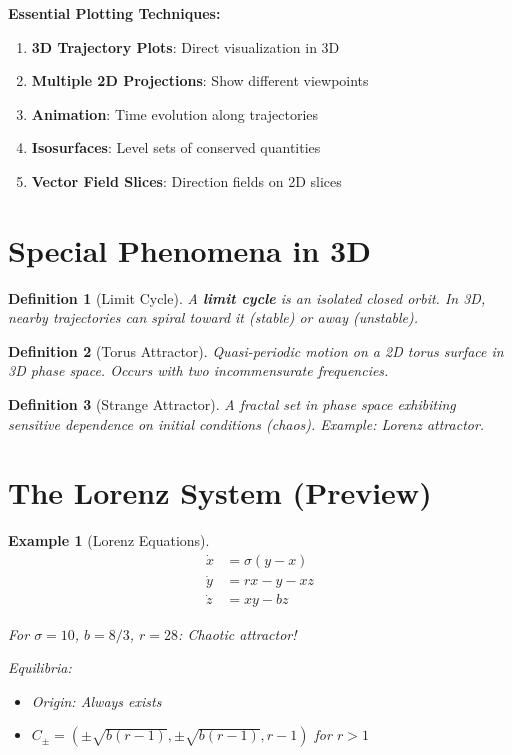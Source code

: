 \documentclass[12pt]{article}
\newtheorem{definition}{Definition}
\newtheorem{example}{Example}
\begin{document}
\begin{visualization}
\textbf{Essential Plotting Techniques:}
\begin{enumerate}
    \item \textbf{3D Trajectory Plots}: Direct visualization in 3D
    \item \textbf{Multiple 2D Projections}: Show different viewpoints
    \item \textbf{Animation}: Time evolution along trajectories
    \item \textbf{Isosurfaces}: Level sets of conserved quantities
    \item \textbf{Vector Field Slices}: Direction fields on 2D slices
\end{enumerate}
\end{visualization}

\section{Special Phenomena in 3D}

\begin{definition}[Limit Cycle]
A \textbf{limit cycle} is an isolated closed orbit. In 3D, nearby trajectories can spiral toward it (stable) or away (unstable).
\end{definition}

\begin{definition}[Torus Attractor]
Quasi-periodic motion on a 2D torus surface in 3D phase space. Occurs with two incommensurate frequencies.
\end{definition}

\begin{definition}[Strange Attractor]
A fractal set in phase space exhibiting sensitive dependence on initial conditions (chaos). Example: Lorenz attractor.
\end{definition}

\section{The Lorenz System (Preview)}

\begin{example}[Lorenz Equations]
$$\begin{aligned}
\dot{x} &= \sigma(y - x) \\
\dot{y} &= rx - y - xz \\
\dot{z} &= xy - bz
\end{aligned}$$

For $\sigma = 10$, $b = 8/3$, $r = 28$: Chaotic attractor!

Equilibria:
\begin{itemize}
    \item Origin: Always exists
    \item $C_\pm = (\pm\sqrt{b(r-1)}, \pm\sqrt{b(r-1)}, r-1)$ for $r > 1$
\end{itemize}
\end{example}
\end{document}
